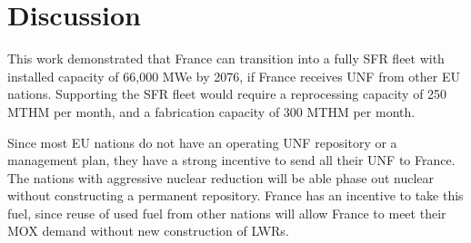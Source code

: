 \section{Discussion}
This work demonstrated that France can transition into
a fully \gls{SFR} fleet with installed capacity of 66,000 MWe by 2076,
if France receives \gls{UNF} from other \gls{EU} nations.
Supporting the \gls{SFR} fleet would require a reprocessing capacity of 250 MTHM per month,
and a fabrication capacity of 300 MTHM per month.

Since most \gls{EU} nations do not have an operating \gls{UNF}
repository or a management plan, they have a strong incentive
to send all their \gls{UNF} to France. The nations
with aggressive nuclear reduction will be able phase out nuclear
without constructing a permanent repository. France has an
incentive to take this fuel, since reuse of used fuel from
other nations will allow France to meet their MOX demand
without new construction of \glspl{LWR}.

